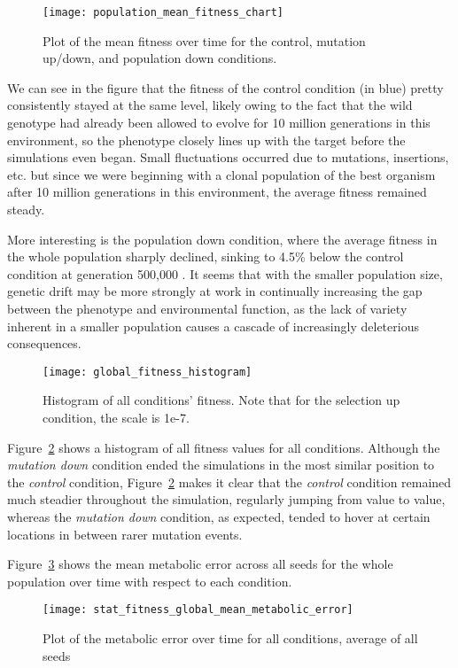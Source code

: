 \begin{figure}[H]
	\texttt{[image: population\_mean\_fitness\_chart]}
	\caption[Mean fitness]{Plot of the mean fitness over time for the control, mutation up/down, and population down conditions.}
	\label{fig:mean_fitness_plot}
\end{figure}

We can see in the figure that the fitness of the control condition (in blue) pretty consistently stayed at the same level, likely owing to the fact that the wild genotype had already been allowed to evolve for 10 million generations in this environment, so the phenotype closely lines up with the target before the simulations even began. Small fluctuations occurred due to mutations, insertions, etc. but since we were beginning with a clonal population of the best organism after 10 million generations in this environment, the average fitness remained steady. 

More interesting is the population down condition, where the average fitness in the whole population sharply declined, sinking to 4.5\% below the control condition at generation 500,000 . It seems that with the smaller population size, genetic drift may be more strongly at work in continually increasing the gap between the phenotype and environmental function, as the lack of variety inherent in a smaller population causes a cascade of increasingly deleterious consequences. 

\begin{figure}[H]
	\texttt{[image: global\_fitness\_histogram]}
	\caption[Mean fitness histogram]{Histogram of all conditions' fitness. Note that for the selection up condition, the scale is 1e-7. }
	\label{fig:global_fitness_histogram}
\end{figure}
Figure~\ref{fig:global_fitness_histogram} shows a histogram of all fitness values for all conditions. Although the \textit{mutation down} condition ended the simulations in the most similar position to the \textit{control} condition, Figure~\ref{fig:global_fitness_histogram} makes it clear that the \textit{control} condition remained much steadier throughout the simulation, regularly jumping from value to value, whereas the \textit{mutation down} condition, as expected, tended to hover at certain locations in between rarer mutation events. 

Figure~\ref{fig:mean_metabolic_error} shows the mean metabolic error across all seeds for the whole population over time with respect to each condition. 
\begin{figure}[H]
	\texttt{[image: stat\_fitness\_global\_mean\_metabolic\_error]}
	\caption[Metabolic error]{Plot of the metabolic error over time for all conditions, average of all seeds}
	\label{fig:mean_metabolic_error}
\end{figure}

